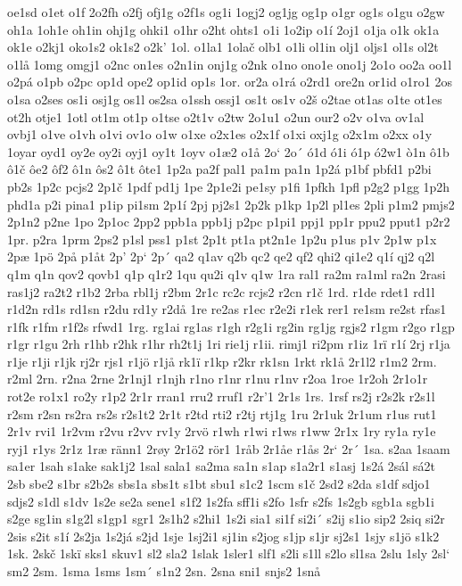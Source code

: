 oe1sd
o1et
o1f
2o2fh
o2fj
ofj1g
o2f1s
og1i
1ogj2
og1jg
og1p
o1gr
og1s
o1gu
o2gw
oh1a
1oh1e
oh1in
ohj1g
ohki1
o1hr
o2ht
ohts1
o1i
1o2ip
o1í
2oj1
o1ja
o1k
ok1a
ok1e
o2kj1
oko1s2
ok1s2
o2k'
1ol.
o1la1
1olač
olb1
o1li
ol1in
olj1
oljs1
ol1s
ol2t
o1lå
1omg
omgj1
o2nc
on1es
o2n1in
onj1g
o2nk
o1no
ono1e
ono1j
2o1o
oo2a
oo1l
o2pá
o1pb
o2pc
op1d
ope2
op1id
op1s
1or.
or2a
o1rá
o2rd1
ore2n
or1id
o1ro1
2os
o1sa
o2ses
os1i
osj1g
os1l
os2sa
o1ssh
ossj1
os1t
os1v
o2š
o2tae
ot1as
o1te
ot1es
ot2h
otje1
1otl
ot1m
ot1p
o1tse
o2t1v
o2tw
2o1u1
o2un
our2
o2v
o1va
ov1al
ovbj1
o1ve
o1vh
o1vi
ov1o
o1w
o1xe
o2x1es
o2x1f
o1xi
oxj1g
o2x1m
o2xx
o1y
1oyar
oyd1
oy2e
oy2i
oyj1
oy1t
1oyv
o1æ2
o1å
2o`
2o´
ó1d
ó1i
ó1p
ó2w1
ò1n
ô1b
ô1č
ôe2
ôf2
ô1n
ôs2
ô1t
ôte1
1p2a
pa2f
pal1
pa1m
pa1n
1p2á
p1bf
pbfd1
p2bi
pb2s
1p2c
pcjs2
2p1č
1pdf
pd1j
1pe
2p1e2i
pe1sy
p1fi
1pfkh
1pfl
p2g2
p1gg
1p2h
phd1a
p2i
pina1
p1ip
pi1sm
2p1í
2pj
pj2s1
2p2k
p1kp
1p2l
pl1es
2pli
p1m2
pmjs2
2p1n2
p2ne
1po
2p1oc
2pp2
ppb1a
ppb1j
p2pc
p1pi1
ppj1
pp1r
ppu2
pput1
p2r2
1pr.
p2ra
1prm
2ps2
p1sl
pss1
p1st
2p1t
pt1a
pt2n1e
1p2u
p1us
p1v
2p1w
p1x
2pæ
1pö
2på
p1åt
2p'
2p`
2p´
qa2
q1av
q2b
qc2
qe2
qf2
qhi2
qi1e2
q1í
qj2
q2l
q1m
q1n
qov2
qovb1
q1p
q1r2
1qu
qu2i
q1v
q1w
1ra
ral1
ra2m
ra1ml
ra2n
2rasi
ras1j2
ra2t2
r1b2
2rba
rbl1j
r2bm
2r1c
rc2c
rcjs2
r2cn
r1č
1rd.
r1de
rdet1
rd1l
r1d2n
rd1s
rd1sn
r2du
rd1y
r2då
1re
re2as
r1ec
r2e2i
r1ek
rer1
re1sm
re2st
rfas1
r1fk
r1fm
r1f2s
rfwd1
1rg.
rg1ai
rg1as
r1gh
r2g1i
rg2in
rg1jg
rgjs2
r1gm
r2go
r1gp
r1gr
r1gu
2rh
r1hb
r2hk
r1hr
rh2t1j
1ri
rie1j
r1ii.
rimj1
ri2pm
r1iz
1rï
r1í
2rj
r1ja
r1je
r1ji
r1jk
rj2r
rjs1
r1jö
r1jå
rk1ï
r1kp
r2kr
rk1sn
1rkt
rk1å
2r1l2
r1m2
2rm.
r2ml
2rn.
r2na
2rne
2r1nj1
r1njh
r1no
r1nr
r1nu
r1nv
r2oa
1roe
1r2oh
2r1o1r
rot2e
ro1x1
ro2y
r1p2
2r1r
rran1
rru2
rruf1
r2r'1
2r1s
1rs.
1rsf
rs2j
r2s2k
r2s1l
r2sm
r2sn
rs2ra
rs2s
r2s1t2
2r1t
r2td
rti2
r2tj
rtj1g
1ru
2r1uk
2r1um
r1us
rut1
2r1v
rvi1
1r2vm
r2vu
r2vv
rv1y
2rvö
r1wh
r1wi
r1ws
r1ww
2r1x
1ry
ry1a
ry1e
ryj1
r1ys
2r1z
1ræ
ränn1
2røy
2r1ö2
rör1
1råb
2r1åe
r1ås
2r`
2r´
1sa.
s2aa
1saam
sa1er
1sah
s1ake
sak1j2
1sal
sala1
sa2ma
sa1n
s1ap
s1a2r1
s1asj
1s2á
2sál
sá2t
2sb
sbe2
s1br
s2b2s
sbs1a
sbs1t
s1bt
sbu1
s1c2
1scm
s1č
2sd2
s2da
s1df
sdjo1
sdjs2
s1dl
s1dv
1s2e
se2a
sene1
s1f2
1s2fa
sff1i
s2fo
1sfr
s2fs
1s2gb
sgb1a
sgb1i
s2ge
sg1in
s1g2l
s1gp1
sgr1
2s1h2
s2hi1
1s2i
sia1
si1f
si2i´
s2ij
s1io
sip2
2siq
si2r
2sis
s2it
s1í
2s2ja
1s2já
s2jd
1sje
1sj2i1
sj1in
s2jog
s1jp
s1jr
sj2s1
1sjy
s1jö
s1k2
1sk.
2skč
1skï
sks1
skuv1
sl2
sla2
1slak
1sler1
slf1
s2li
s1ll
s2lo
sl1sa
2slu
1sly
2sl`
sm2
2sm.
1sma
1sms
1sm´
s1n2
2sn.
2sna
sni1
snjs2
1snå
